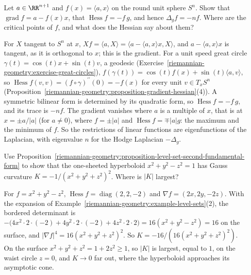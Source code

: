 \begin{exercise}\label{riemannian-geometry:exercise-height-sphere}
Let $a \in \RR^{n+1}$ and $f(x) = \langle a, x\rangle$ on the round unit sphere $S^n$. Show that $\operatorname{grad}f = a - f(x)x$, that $\operatorname{Hess}f = -f\,g$, and hence $\Delta_gf = -nf$. Where are the
critical points of $f$, and what does the Hessian say about them?
\end{exercise}

\begin{solution}
For $X$ tangent to $S^n$ at $x$, $Xf = \langle a, X\rangle = \langle a - \langle a, x\rangle x, X\rangle$, and $a - \langle a, x\rangle x$ is tangent, as it is orthogonal to $x$; this is the gradient. For a unit speed great
circle $\gamma(t) = \cos(t)x + \sin(t)v$, a geodesic (Exercise~\ref{riemannian-geometry:exercise-great-circles}), $f(\gamma(t)) = \cos(t)f(x) + \sin(t)\langle a, v\rangle$, so
$\operatorname{Hess}f(v, v) = (f \circ \gamma)^{\prime\prime}(0) = -f(x)$ for every unit $v \in T_xS^n$ (Proposition~\ref{riemannian-geometry:proposition-gradient-hessian}(4)). A symmetric bilinear form is determined by its
quadratic form, so $\operatorname{Hess}f = -f\,g$, and its trace is $-nf$. The gradient vanishes where $a$ is a multiple of $x$, that is at $x = \pm a/|a|$ (for $a \neq 0$), where $f = \pm|a|$ and
$\operatorname{Hess}f = \mp|a|g$: the maximum and the minimum of $f$. So the restrictions of linear functions are eigenfunctions of the Laplacian, with eigenvalue $n$ for the Hodge Laplacian $-\Delta_g$.
\end{solution}

\begin{exercise}\label{riemannian-geometry:exercise-hyperboloid-curvature}
Use Proposition~\ref{riemannian-geometry:proposition-level-set-second-fundamental-form} to show that the one-sheeted hyperboloid $x^2 + y^2 - z^2 = 1$ has Gauss curvature $K = -1/(x^2 + y^2 + z^2)^2$. Where is $|K|$
largest?
\end{exercise}

\begin{solution}
For $f = x^2 + y^2 - z^2$, $\operatorname{Hess}f = \operatorname{diag}(2, 2, -2)$ and $\nabla f = (2x, 2y, -2z)$. With the expansion of Example~\ref{riemannian-geometry:example-level-sets}(2), the bordered determinant is
$-\bigl(4x^2 \cdot 2 \cdot (-2) + 4y^2 \cdot 2 \cdot (-2) + 4z^2 \cdot 2 \cdot 2\bigr) = 16(x^2 + y^2 - z^2) = 16$ on the surface, and $|\nabla f|^4 = 16(x^2 + y^2 + z^2)^2$. So
$K = -16/(16(x^2 + y^2 + z^2)^2)$. On the surface $x^2 + y^2 + z^2 = 1 + 2z^2 \geq 1$, so $|K|$ is largest, equal to $1$, on the waist circle $z = 0$, and $K \to 0$ far out, where the hyperboloid approaches its
asymptotic cone.
\end{solution}

